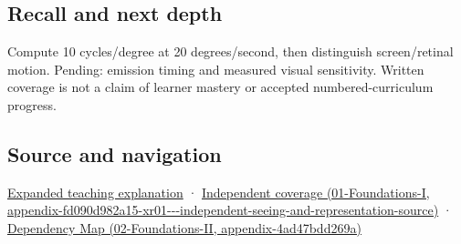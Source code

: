 \subsection{Recall and next depth}\label{appendix-70895739febb-recall-and-next-depth}

Compute 10 cycles/degree at 20 degrees/second, then distinguish screen/retinal motion. Pending: emission timing and measured visual sensitivity. Written coverage is not a claim of learner mastery or accepted numbered-curriculum progress.

\subsection{Source and navigation}\label{appendix-70895739febb-source-and-navigation}

\hyperref[04-visual-computing-ii-ch042-a-gaze-sample-needs-a-time-as-well-as-a-direction]{Expanded teaching explanation} · \href{../01-Foundations-I/main.pdf\#nameddest=appendix-fd090d982a15-xr01---independent-seeing-and-representation-source}{Independent coverage (01-Foundations-I, appendix-fd090d982a15-xr01-\/-\/-independent-seeing-and-representation-source)} · \href{../02-Foundations-II/main.pdf\#nameddest=appendix-4ad47bdd269a}{Dependency Map (02-Foundations-II, appendix-4ad47bdd269a)}
